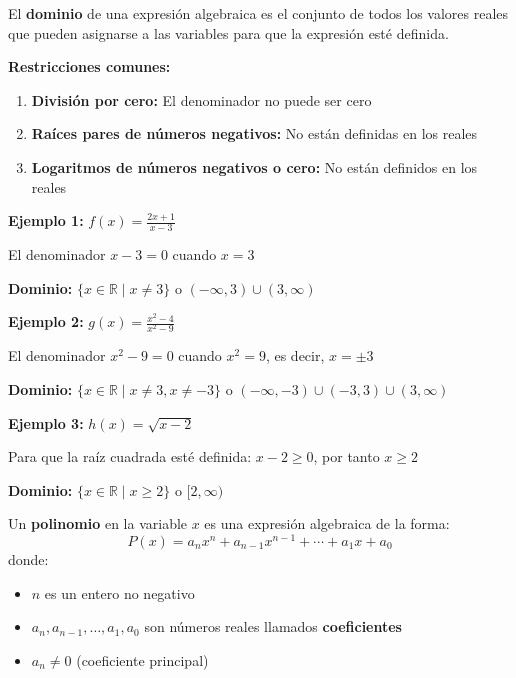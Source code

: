 
\begin{definition}
El \textbf{dominio} de una expresión algebraica es el conjunto de todos los valores reales que pueden asignarse a las variables para que la expresión esté definida.
\end{definition}

\textbf{Restricciones comunes:}
\begin{enumerate}
\item \textbf{División por cero:} El denominador no puede ser cero
\item \textbf{Raíces pares de números negativos:} No están definidas en los reales
\item \textbf{Logaritmos de números negativos o cero:} No están definidos en los reales
\end{enumerate}

\begin{example}
\textbf{Ejemplo 1:} $f(x) = \frac{2x + 1}{x - 3}$

El denominador $x - 3 = 0$ cuando $x = 3$

\textbf{Dominio:} $\{x \in \mathbb{R} \mid x \neq 3\}$ o $(-\infty, 3) \cup (3, \infty)$

\textbf{Ejemplo 2:} $g(x) = \frac{x^2 - 4}{x^2 - 9}$

El denominador $x^2 - 9 = 0$ cuando $x^2 = 9$, es decir, $x = \pm 3$

\textbf{Dominio:} $\{x \in \mathbb{R} \mid x \neq 3, x \neq -3\}$ o $(-\infty, -3) \cup (-3, 3) \cup (3, \infty)$

\textbf{Ejemplo 3:} $h(x) = \sqrt{x - 2}$

Para que la raíz cuadrada esté definida: $x - 2 \geq 0$, por tanto $x \geq 2$

\textbf{Dominio:} $\{x \in \mathbb{R} \mid x \geq 2\}$ o $[2, \infty)$
\end{example}


\begin{definition}
Un \textbf{polinomio} en la variable $x$ es una expresión algebraica de la forma:
$$P(x) = a_n x^n + a_{n-1} x^{n-1} + \cdots + a_1 x + a_0$$
donde:
\begin{itemize}
\item $n$ es un entero no negativo
\item $a_n, a_{n-1}, \ldots, a_1, a_0$ son números reales llamados \textbf{coeficientes}
\item $a_n \neq 0$ (coeficiente principal)
\end{itemize}
\end{definition}

